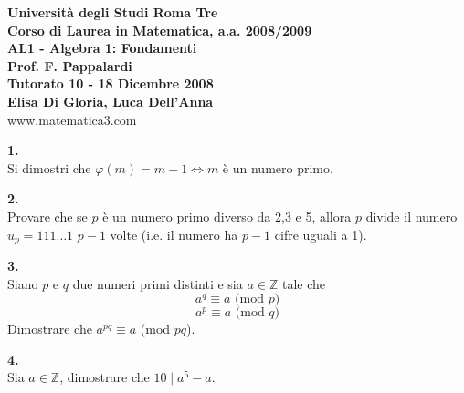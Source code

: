 \documentclass[italian,a4paper,11pt]
{article}
\newcommand{\Z}{\mathbb Z}
\newcommand{\Sse}{\Longleftrightarrow}
\begin{document}
\begin{center}


\textbf{Universit\`a degli Studi Roma Tre}\\

\textbf{Corso di Laurea in Matematica, a.a. 2008/2009}\\

\textbf{AL1 - Algebra 1: Fondamenti}\\

\textbf{Prof. F. Pappalardi}\\

\textbf{Tutorato 10 - 18 Dicembre 2008}\\

\textbf{Elisa Di Gloria, Luca Dell'Anna}\\

www.matematica3.com\\
\end{center}



\vspace{0.5cm}




\noindent
\begin{Ex}\textbf{ 1.}\\
Si dimostri che $\varphi(m)=m-1 \Sse m$ \`e un numero primo.
\end{Ex}

\vspace{0.4cm}
\noindent
\begin{Ex}\textbf{ 2.}\\
Provare che se $p$ \`e un numero primo diverso da 2,3 e 5, allora $p$ divide il numero $u_p=111\dots 1$ \quad $p-1$ volte (i.e. il numero ha $p-1$ cifre uguali a 1). 
\end{Ex}

\vspace{0.4cm}
\noindent
\begin{Ex}\textbf{ 3.}\\
Siano $p$ e $q$ due numeri primi distinti e sia $a\in \Z$ tale che
$$a^q\equiv a \textrm{ (mod $p$)}$$ $$a^p\equiv a \textrm{ (mod $q$)}$$
Dimostrare che $a^{pq}\equiv a$ (mod $pq$).
\end{Ex}


\vspace{0.4cm}
\noindent
\begin{Ex}\textbf{ 4.}\\
Sia $a\in \Z$, dimostrare che $10\mid a^5-a$.
\end{Ex}
\end{document}
